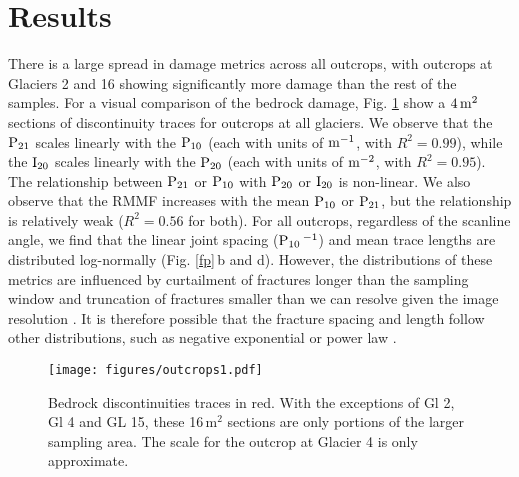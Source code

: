 \documentclass[review]{igs}
\begin{document}
\section{Results}

There is a large spread in damage metrics across all outcrops, with outcrops at Glaciers 2 and 16 showing significantly more damage than the rest of the samples. For a visual comparison of the bedrock damage, Fig. \ref{oc} show a $\rm 4\,m^2$ sections of discontinuity traces for outcrops at all glaciers. We observe that the $\rm P_{21}$ scales linearly with the $\rm P_{10}$ (each with units of $\rm m^{-1}$, with $R^2=0.99$), while the $\rm I_{20}$ scales linearly with the $\rm P_{20}$ (each with units of $\rm m^{-2}$, with $R^2=0.95$). The relationship between $\rm P_{21}$ or $\rm P_{10}$ with $\rm P_{20}$ or $\rm I_{20}$ is non-linear. We also observe that the RMMF increases with the mean $\rm P_{10}$ or $\rm P_{21}$, but the relationship is relatively weak ($R^2=0.56$ for both). For all outcrops, regardless of the scanline angle, we find that the linear joint spacing ($\rm P_{10}\,^{-1}$) and mean trace lengths are distributed log-normally  (Fig. \ref{fp}\,b and d). However, the distributions of these metrics are influenced by curtailment of fractures longer than the sampling window and truncation of fractures smaller than we can resolve given the image resolution \citep[e.g.][]{Hudson1979}. It is therefore possible that the fracture spacing and length follow other distributions, such as negative exponential \citep[e.g.][]{Hudson1979} or power law \citep[e.g.][]{Bonnet2001}. 

\begin{figure}[H]
  \centering
  \texttt{[image: figures/outcrops1.pdf]}
  \caption[]{Bedrock discontinuities traces in red. With the exceptions of Gl 2, Gl 4 and GL 15, these 16\,m$^2$ sections are only portions of the larger sampling area. The scale for the outcrop at Glacier 4 is only approximate.}
\label{oc}
\end{figure}
\end{document}
